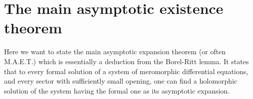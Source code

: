 \section{The main asymptotic existence theorem}
\TODO[move] 
\begin{comment}
  \begin{multicols}{2}
    \textbf{Classical:}
    \begin{itemize}
      \item \cite[Thm.4.4.1]{Loday2014}
      \item \cite[Thm.7.10]{van2003galois}{\tiny\cite[Thm.7.12]{van2003galois}}
      \item \cite[Thm.IV.12.1]{wasow2002asymptotic}
      \item \cite[5.3.Thm.1]{Varadarajan96linearmeromorphic}
      \item \cite[207]{Balser2000Formal}: Some historical remarks
      \item \cite[Thm.A]{BJL1979Birkhoff}
    \end{itemize}
  \columnbreak
    \textbf{Sheafical:}
    \begin{itemize}
      \item \cite[Thm.2.3.1]{sabbah_cimpa90}
      \item \cite[Sec.4.4]{Loday2014}
    \end{itemize}
  \end{multicols}
\end{comment}
Here we want to state the main asymptotic expansion theorem (or often M.A.E.T.)
which is essentially a deduction from the Borel-Ritt lemma.
It states that to every formal solution of a system of meromorphic differential
equations, and every sector with sufficiently small opening, one can find a
holomorphic solution of the system having the formal one as its asymptotic
expansion.

